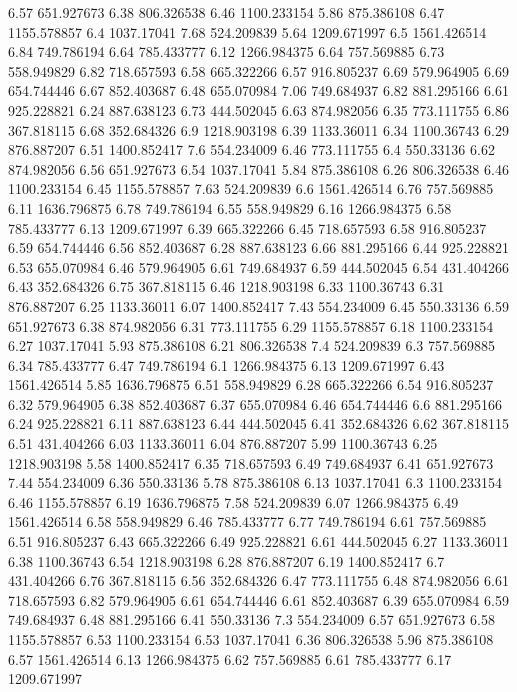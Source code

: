 6.57	651.927673
6.38	806.326538
6.46	1100.233154
5.86	875.386108
6.47	1155.578857
6.4	1037.17041
7.68	524.209839
5.64	1209.671997
6.5	1561.426514
6.84	749.786194
6.64	785.433777
6.12	1266.984375
6.64	757.569885
6.73	558.949829
6.82	718.657593
6.58	665.322266
6.57	916.805237
6.69	579.964905
6.69	654.744446
6.67	852.403687
6.48	655.070984
7.06	749.684937
6.82	881.295166
6.61	925.228821
6.24	887.638123
6.73	444.502045
6.63	874.982056
6.35	773.111755
6.86	367.818115
6.68	352.684326
6.9	1218.903198
6.39	1133.36011
6.34	1100.36743
6.29	876.887207
6.51	1400.852417
7.6	554.234009
6.46	773.111755
6.4	550.33136
6.62	874.982056
6.56	651.927673
6.54	1037.17041
5.84	875.386108
6.26	806.326538
6.46	1100.233154
6.45	1155.578857
7.63	524.209839
6.6	1561.426514
6.76	757.569885
6.11	1636.796875
6.78	749.786194
6.55	558.949829
6.16	1266.984375
6.58	785.433777
6.13	1209.671997
6.39	665.322266
6.45	718.657593
6.58	916.805237
6.59	654.744446
6.56	852.403687
6.28	887.638123
6.66	881.295166
6.44	925.228821
6.53	655.070984
6.46	579.964905
6.61	749.684937
6.59	444.502045
6.54	431.404266
6.43	352.684326
6.75	367.818115
6.46	1218.903198
6.33	1100.36743
6.31	876.887207
6.25	1133.36011
6.07	1400.852417
7.43	554.234009
6.45	550.33136
6.59	651.927673
6.38	874.982056
6.31	773.111755
6.29	1155.578857
6.18	1100.233154
6.27	1037.17041
5.93	875.386108
6.21	806.326538
7.4	524.209839
6.3	757.569885
6.34	785.433777
6.47	749.786194
6.1	1266.984375
6.13	1209.671997
6.43	1561.426514
5.85	1636.796875
6.51	558.949829
6.28	665.322266
6.54	916.805237
6.32	579.964905
6.38	852.403687
6.37	655.070984
6.46	654.744446
6.6	881.295166
6.24	925.228821
6.11	887.638123
6.44	444.502045
6.41	352.684326
6.62	367.818115
6.51	431.404266
6.03	1133.36011
6.04	876.887207
5.99	1100.36743
6.25	1218.903198
5.58	1400.852417
6.35	718.657593
6.49	749.684937
6.41	651.927673
7.44	554.234009
6.36	550.33136
5.78	875.386108
6.13	1037.17041
6.3	1100.233154
6.46	1155.578857
6.19	1636.796875
7.58	524.209839
6.07	1266.984375
6.49	1561.426514
6.58	558.949829
6.46	785.433777
6.77	749.786194
6.61	757.569885
6.51	916.805237
6.43	665.322266
6.49	925.228821
6.61	444.502045
6.27	1133.36011
6.38	1100.36743
6.54	1218.903198
6.28	876.887207
6.19	1400.852417
6.7	431.404266
6.76	367.818115
6.56	352.684326
6.47	773.111755
6.48	874.982056
6.61	718.657593
6.82	579.964905
6.61	654.744446
6.61	852.403687
6.39	655.070984
6.59	749.684937
6.48	881.295166
6.41	550.33136
7.3	554.234009
6.57	651.927673
6.58	1155.578857
6.53	1100.233154
6.53	1037.17041
6.36	806.326538
5.96	875.386108
6.57	1561.426514
6.13	1266.984375
6.62	757.569885
6.61	785.433777
6.17	1209.671997
